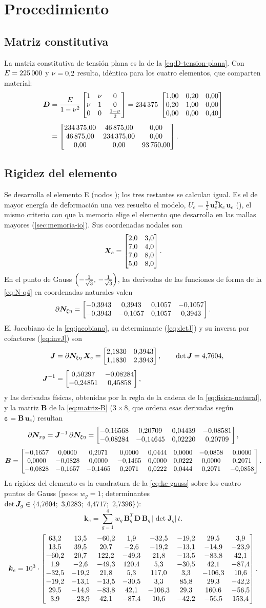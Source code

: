 \section{Procedimiento}

\subsection{Matriz constitutiva}

La matriz constitutiva de tensión plana es la de la \autoref{eq:D-tension-plana}. Con $E=\valE$ y $\nu=\valNu$ resulta, idéntica para los cuatro elementos, que comparten material:
\begin{align*}
\bm{D}&=\frac{E}{1-\nu^{2}}
\begin{bmatrix} 1 & \nu & 0 \\ \nu & 1 & 0 \\ 0 & 0 & \tfrac{1-\nu}{2} \end{bmatrix}
=\valDfactor\;\DmatNorm \\[0.4em]
&=\Dmat .
\end{align*}

\subsection{Rigidez del elemento}

Se desarrolla el elemento E\showId{} (nodos \showNodes); los tres restantes se calculan igual. Es el de mayor energía de deformación una vez resuelto el modelo, $U_e=\tfrac12\,\bm{u}_e^{T}\bm{k}_e\,\bm{u}_e$ (\energiaInline), el mismo criterio con que la memoria elige el elemento que desarrolla en las mallas mayores (\autoref{sec:memoria-io}). Sus coordenadas nodales son
\[
\bm{X}_e=\Xemat .
\]
En el punto de Gauss $\gpA$, las derivadas de las funciones de forma de la \autoref{eq:N-q4} en coordenadas naturales valen
\[
\partial\bm{N}_{\xi\eta}=\dNnatA .
\]
El Jacobiano de la \autoref{eq:jacobiano}, su determinante (\autoref{eq:detJ}) y su inversa por cofactores (\autoref{eq:invJ}) son
\begin{align*}
\bm{J}&=\partial\bm{N}_{\xi\eta}\,\bm{X}_e=\Jmata, \qquad
\det\bm{J}=\detJa, \\[0.4em]
\bm{J}^{-1}&=\invJa,
\end{align*}
y las derivadas físicas, obtenidas por la regla de la cadena de la \autoref{eq:fisica-natural}, y la matriz $\bm{B}$ de la \autoref{eq:matriz-B} ($3\times 8$, que ordena esas derivadas según $\bm{\varepsilon}=\bm{B}\,\bm{u}_e$) resultan
\[
\partial\bm{N}_{xy}=\bm{J}^{-1}\,\partial\bm{N}_{\xi\eta}=\dNphysA ,
\]
{\footnotesize\setlength{\arraycolsep}{4pt}
\[
\bm{B}=\Bmata .
\]
}%
La rigidez del elemento es la cuadratura de la \autoref{eq:ke-gauss} sobre los cuatro puntos de Gauss (pesos $w_g=1$; determinantes $\det\bm{J}_g \in \{\detJinline\}$):
\[
\bm{k}_e=\sum_{g=1}^{4} w_g\,\bm{B}_g^{T}\,\bm{D}\,\bm{B}_g\,\lvert\det\bm{J}_g\rvert\,t .
\]
{\footnotesize\setlength{\arraycolsep}{3.5pt}
\[
\bm{k}_e=\keScale\cdot\keMat .
\]
}%

